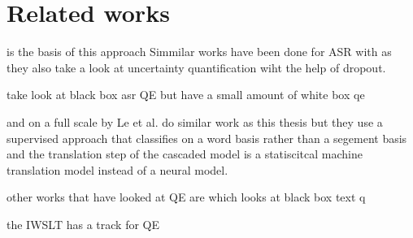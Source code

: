 
\chapter{Related works}
\label{ch:relatecworks}
\cite{fomicheva2020unsupervised} is the basis of this approach
Simmilar works have been done for ASR with \cite{8683086} as they also take a look at uncertainty quantification wiht the help of dropout. 

\cite{negri-etal-2014-quality} take look at black box asr QE but have a small amount of white box qe

and on a full scale by 
Le et al. \cite{le2016automatic} do similar work as this thesis but they use a supervised approach that classifies on a word basis rather than a segement basis and the translation step of the cascaded model is a statiscitcal machine translation model instead of a neural model. 

other works that have looked at QE are \cite{dinh2023perturbationbasedqeexplainableunsupervised} which looks at black box text q

the IWSLT has a track for QE 
